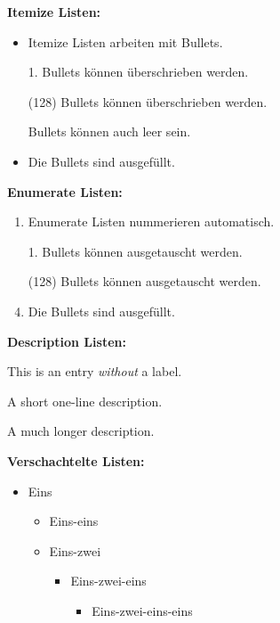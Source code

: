 \documentclass[a5paper]{article}
\begin{document}
\textbf{Itemize Listen:}




\begin{itemize}
  \item Itemize Listen arbeiten mit Bullets.
  \item[1.] Bullets können überschrieben werden.
  \item[(128)] Bullets können überschrieben werden.
  \item[] Bullets können auch leer sein.
  \item Die Bullets sind ausgefüllt.
\end{itemize}

\textbf{Enumerate Listen:}

\begin{enumerate}
  \item Enumerate Listen nummerieren automatisch.
  \item[1.] Bullets können ausgetauscht werden.
  \item[(128)] Bullets können ausgetauscht werden.
  \item Die Bullets sind ausgefüllt.
\end{enumerate}

\textbf{Description Listen:}

\begin{description}
  \item This is an entry \textit{without} a label.
  \item[Something short] A short one-line description.
  \item[Something long] A much longer description. \blindtext[1]
\end{description}

\textbf{Verschachtelte Listen:}

\begin{itemize}
  \item Eins
  \begin{itemize}
  \item Eins-eins
  \item Eins-zwei
  \begin{itemize}
    \item Eins-zwei-eins
    \begin{itemize}
      \item Eins-zwei-eins-eins
    \end{itemize}
  \end{itemize}
  \end{itemize}
\end{itemize}
\end{document}
